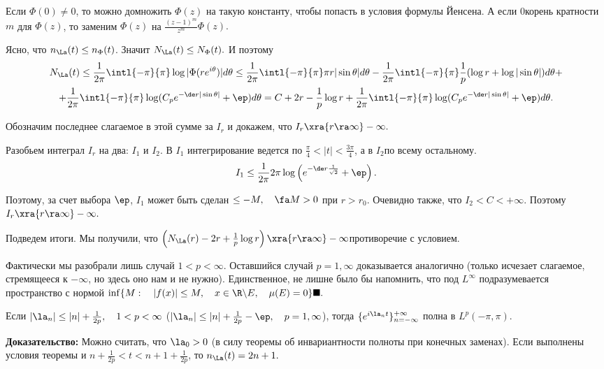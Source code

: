 \documentclass[a4paper]{article}
\begin{document}
Если $\Phi(0)\neq0$, то можно домножить $\Phi(z)$ на такую
константу, чтобы попасть в условия формулы Йенсена. А если $0$\т корень кратности $m$ для $\Phi(z)$, то заменим $\Phi(z)$ на
$\frac{(z-1)^m}{z^m}\Phi(z).$

Ясно, что $n_{\La}(t)\le n_{\Phi}(t)$. Значит
$N_{\La}(t)\le N_{\Phi}(t).$ И поэтому
\begin{multline*}
N_{\La}(t)\le\frac1{2\pi}\intl{-\pi}{\pi}\log|\Phi(re^{i\theta})|d\theta\le
\frac1{2\pi}\intl{-\pi}{\pi}\pi
r|\sin\theta|d\theta-\frac1{2\pi}\intl{-\pi}{\pi}\frac1p(\log
r+\log|\sin\theta|)d\theta+\\
+\frac1{2\pi}\intl{-\pi}{\pi}\log(C_pe^{-\de
r|\sin\theta|}+\ep)d\theta=C+2r-\frac1p\log
r+\frac1{2\pi}\intl{-\pi}{\pi}\log(C_pe^{-\de
r|\sin\theta|}+\ep)d\theta.
\end{multline*}

Обозначим последнее слагаемое в этой сумме за $I_r$ и докажем, что
$I_r\xra{r\ra\infty} -\infty.$

Разобьем интеграл $I_r$ на два: $I_1$ и $I_2$. В $I_1$
интегрирование ведется по $\frac{\pi}4<|t|<\frac{3\pi}4$, а в
$I_2$\т по всему остальному.
$$I_1\le\frac1{2\pi}2\pi\log\left(e^{-\de
r\frac1{\sqrt{2}}}+\ep\right).$$

Поэтому, за счет выбора $\ep$, $I_1$ может быть сделан
$\le-M,\quad\fa M>0$ при $r>r_0$. Очевидно также, что
$I_2<C<+\infty.$ Поэтому $I_r\xra{r\ra\infty}
-\infty.$

Подведем итоги. Мы получили, что $\left(N_{\La}(r)-2r+\frac1p
\log r\right)\xra{r\ra\infty}-\infty$\т противоречие с условием.

Фактически мы разобрали лишь случай $1<p<\infty.$ Оставшийся
случай $p=1,\infty$ доказывается аналогично (только исчезает
слагаемое, стремящееся к $-\infty$, но здесь оно нам и не нужно).
Единственное, не лишне было бы напомнить, что под $L^{\infty}$
подразумевается пространство с нормой $\inf\{M:\quad|f(x)|\le
M,\quad x\in\R \backslash E,\quad\mu(E)=0\}\blacksquare.$

\begin{sled}
Если $|\la_n|\le|n|+\frac1{2p},\quad1<p<\infty$
($|\la_n|\le|n|+\frac1{2p}-\ep,\quad p=1,\infty$),
тогда $\{e^{i\la_n t}\}_{n=-\infty}^{+\infty}$ полна в
$L^p(-\pi,\pi).$
\end{sled}
\textbf{Доказательство:} Можно считать, что $\la_0>0$ (в силу
теоремы об инвариантности полноты при конечных заменах). Если
выполнены условия теоремы и $n+\frac1{2p}<t<n+1+\frac1{2p}$, то
$n_{\La}(t)=2n+1.$
\end{document}
